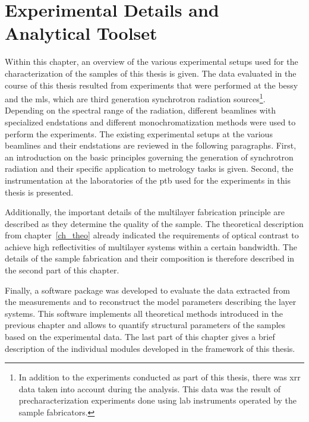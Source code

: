 \chapter{Experimental Details and Analytical Toolset} \label{ch_exp}
Within this chapter, an overview of the various experimental setups used for the characterization of the samples of this thesis is given. The data evaluated in the course of this thesis resulted from experiments that were performed at the \gls{bessy} and the \gls{mls}, which are third generation synchrotron radiation sources\footnote{In addition to the experiments conducted as part of this thesis, there was \gls{xrr} data taken into account during the analysis. This data was the result of precharacterization experiments done using lab instruments operated by the sample fabricators.}. Depending on the spectral range of the radiation, different beamlines with specialized endstations and different monochromatization methods were used to perform the experiments. The existing experimental setups at the various beamlines and their endstations are reviewed in the following paragraphs. First, an introduction on the basic principles governing the generation of synchrotron radiation and their specific application to metrology tasks is given. Second, the instrumentation at the laboratories of the \gls{ptb} used for the experiments in this thesis is presented.

Additionally, the important details of the multilayer fabrication principle are described as they determine the quality of the sample. The theoretical description from chapter~\ref{ch_theo} already indicated the requirements of optical contrast to achieve high reflectivities of multilayer systems within a certain bandwidth. The details of the sample fabrication and their composition is therefore described in the second part of this chapter.

Finally, a software package was developed to evaluate the data extracted from the measurements and to reconstruct the model parameters describing the layer systems. This software implements all theoretical methods introduced in the previous chapter and allows to quantify structural parameters of the samples based on the experimental data. The last part of this chapter gives a brief description of the individual modules developed in the framework of this thesis.

